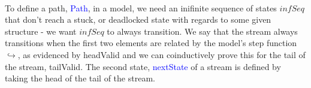 \documentclass[a4paper, 11pt]{article}
\newcommand{\blue}[1]{\textcolor{blue}{#1}}
\newcommand{\pink}[1]{\textcolor{hotmagenta}{#1}}
\begin{document}
\begin{code}[hide]%
\>[0]\AgdaSpace{}%
\AgdaSpace{}%
\AgdaSymbol{(}\AgdaSpace{}%
\AgdaSymbol{:}\AgdaSpace{}%
\AgdaSymbol{)}\AgdaSpace{}%
\AgdaSymbol{(}\AgdaSpace{}%
\AgdaSymbol{:}\AgdaSpace{}%
\AgdaSpace{}%
\AgdaSymbol{)}\AgdaSpace{}%
\<%
\\
\>[0][@{}l@{\AgdaIndent{0}}]%
\>[2]\AgdaSpace{}%
\AgdaSpace{}%
\AgdaSpace{}%
\<%
\\
%
\>[2]\AgdaSpace{}%
\AgdaSpace{}%
\<%
\end{code}
\begin{code}%
%
\>[2]\AgdaSpace{}%
\AgdaSpace{}%
\AgdaSymbol{:}\AgdaSpace{}%
\AgdaSpace{}%
\<%
\\
\>[2][@{}l@{\AgdaIndent{0}}]%
\>[4]\<%
\\
%
\>[4]\<%
\\
\>[4][@{}l@{\AgdaIndent{0}}]%
\>[6]\AgdaSpace{}%
\AgdaSymbol{:}\AgdaSpace{}%
\<%
\\
%
\>[6]\AgdaSpace{}%
\AgdaSymbol{:}\AgdaSpace{}%
\<%
\end{code}
\begin{code}[hide]%
%
\>[2]\AgdaSpace{}%
\<%
\end{code}

To define a path, \blue{Path}, in a model, we need an inifinite sequence of
states \pink{$infSeq$} that don't reach a stuck, or deadlocked state with
regards to some given structure - we want \pink{$infSeq$} to always transition.
We say that the stream always transitions when the first two elements are
related by the model's step function \pink{$\hookrightarrow$}, as evidenced by
\pink{headValid} and we can coinductively prove this for the tail of the stream,
\pink{tailValid}. The second state, \blue{nextState} of a stream is defined by taking
the head of the tail of the stream.
\end{document}
